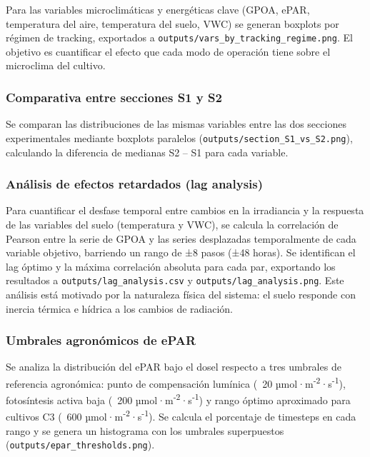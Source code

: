 \documentclass[12pt, a4paper]{article}
\begin{document}
Para las variables microclimáticas y energéticas clave (GPOA, ePAR, temperatura del aire, temperatura del suelo, VWC) se generan boxplots por régimen de tracking, exportados a \texttt{outputs/vars\_by\_tracking\_regime.png}. El objetivo es cuantificar el efecto que cada modo de operación tiene sobre el microclima del cultivo.

\subsubsection{Comparativa entre secciones S1 y S2}

Se comparan las distribuciones de las mismas variables entre las dos secciones experimentales mediante boxplots paralelos (\texttt{outputs/section\_S1\_vs\_S2.png}), calculando la diferencia de medianas S2 -- S1 para cada variable.

\subsubsection{Análisis de efectos retardados (lag analysis)}

Para cuantificar el desfase temporal entre cambios en la irradiancia y la respuesta de las variables del suelo (temperatura y VWC), se calcula la correlación de Pearson entre la serie de GPOA y las series desplazadas temporalmente de cada variable objetivo, barriendo un rango de ±8 pasos (±48 horas). Se identifican el lag óptimo y la máxima correlación absoluta para cada par, exportando los resultados a \texttt{outputs/lag\_analysis.csv} y \texttt{outputs/lag\_analysis.png}. Este análisis está motivado por la naturaleza física del sistema: el suelo responde con inercia térmica e hídrica a los cambios de radiación.

\subsubsection{Umbrales agronómicos de ePAR}

Se analiza la distribución del ePAR bajo el dosel respecto a tres umbrales de referencia agronómica: punto de compensación lumínica (~20 µmol·m\textsuperscript{-2}·s\textsuperscript{-1}), fotosíntesis activa baja (~200 µmol·m\textsuperscript{-2}·s\textsuperscript{-1}) y rango óptimo aproximado para cultivos C3 (~600 µmol·m\textsuperscript{-2}·s\textsuperscript{-1}). Se calcula el porcentaje de timesteps en cada rango y se genera un histograma con los umbrales superpuestos (\texttt{outputs/epar\_thresholds.png}).
\end{document}
